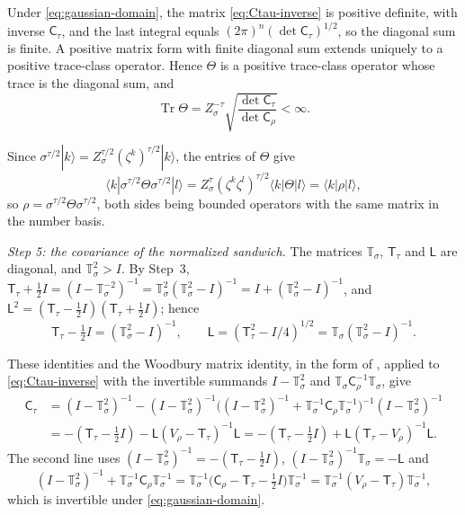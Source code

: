\documentclass[11pt]{amsart}
\numberwithin{equation}{section}
\theoremstyle{definition}
\newcommand{\Tr}{\operatorname{Tr}}
\begin{document}
Under \eqref{eq:gaussian-domain}, the matrix \eqref{eq:Ctau-inverse} is
positive definite, with inverse \(\mathsf C_\tau\), and the last
integral equals \((2\pi)^n(\det\mathsf C_\tau)^{1/2}\), so the diagonal
sum is finite. A positive matrix form with finite diagonal sum extends
uniquely to a positive trace-class operator. Hence \(\Theta\) is a
positive trace-class operator whose trace is the diagonal sum, and
\begin{equation}
 \Tr\Theta
 =Z_\sigma^{-\tau}
  \sqrt{\frac{\det\mathsf C_\tau}{\det\mathsf C_\rho}}
 <\infty.
 \label{eq:traceTheta}
\end{equation}

Since \(\sigma^{\tau/2}|k\rangle=Z_\sigma^{\tau/2}(\zeta^k)^{\tau/2}|k\rangle\),
the entries of \(\Theta\) give
\[
 \langle k|\sigma^{\tau/2}\Theta\sigma^{\tau/2}|l\rangle
 =Z_\sigma^{\tau}(\zeta^k\zeta^l)^{\tau/2}\langle k|\Theta|l\rangle
 =\langle k|\rho|l\rangle ,
\]
so \(\rho=\sigma^{\tau/2}\Theta\sigma^{\tau/2}\), both sides being
bounded operators with the same matrix in the number basis.

\smallskip
\emph{Step 5: the covariance of the normalized sandwich.} The
matrices \(\mathbb T_\sigma\), \(\mathsf T_\tau\) and \(\mathsf L\) are
diagonal, and \(\mathbb T_\sigma^2>I\). By Step~3,
\(\mathsf T_\tau+\tfrac12I=(I-\mathbb T_\sigma^{-2})^{-1}
=\mathbb T_\sigma^2(\mathbb T_\sigma^2-I)^{-1}
=I+(\mathbb T_\sigma^2-I)^{-1}\), and
\(\mathsf L^2=(\mathsf T_\tau-\tfrac12I)(\mathsf T_\tau+\tfrac12I)\);
hence
\[
 \mathsf T_\tau-\tfrac12I=(\mathbb T_\sigma^2-I)^{-1},\qquad
 \mathsf L=(\mathsf T_\tau^2-I/4)^{1/2}
 =\mathbb T_\sigma(\mathbb T_\sigma^2-I)^{-1}.
\]

These identities and the Woodbury matrix identity, in the form of
\cite[Lemma~5]{SLW18}, applied to \eqref{eq:Ctau-inverse} with the
invertible summands \(I-\mathbb T_\sigma^2\) and
\(\mathbb T_\sigma\mathsf C_\rho^{-1}\mathbb T_\sigma\), give
\begin{align*}
 \mathsf C_\tau
 &=(I-\mathbb T_\sigma^2)^{-1}
  -(I-\mathbb T_\sigma^2)^{-1}
   \bigl((I-\mathbb T_\sigma^2)^{-1}
   +\mathbb T_\sigma^{-1}\mathsf C_\rho\mathbb T_\sigma^{-1}\bigr)^{-1}
   (I-\mathbb T_\sigma^2)^{-1}\\
 &=-(\mathsf T_\tau-\tfrac12I)
  -\mathsf L(V_\rho-\mathsf T_\tau)^{-1}\mathsf L
 =-(\mathsf T_\tau-\tfrac12I)
  +\mathsf L(\mathsf T_\tau-V_\rho)^{-1}\mathsf L .
\end{align*}
The second line uses
\((I-\mathbb T_\sigma^2)^{-1}=-(\mathsf T_\tau-\tfrac12I)\),
\((I-\mathbb T_\sigma^2)^{-1}\mathbb T_\sigma=-\mathsf L\) and
\[
 (I-\mathbb T_\sigma^2)^{-1}
 +\mathbb T_\sigma^{-1}\mathsf C_\rho\mathbb T_\sigma^{-1}
 =\mathbb T_\sigma^{-1}
  \bigl(\mathsf C_\rho-\mathsf T_\tau-\tfrac12I\bigr)\mathbb T_\sigma^{-1}
 =\mathbb T_\sigma^{-1}(V_\rho-\mathsf T_\tau)\mathbb T_\sigma^{-1},
\]
which is invertible under \eqref{eq:gaussian-domain}.
\end{document}
